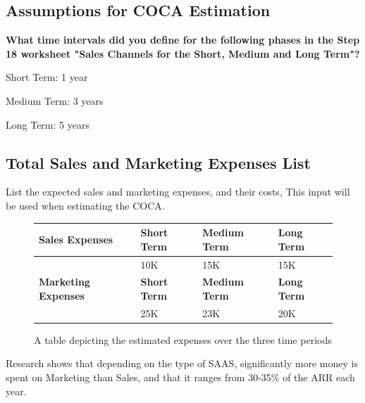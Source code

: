 \documentclass{article}
\begin{document}
        \subsection{Assumptions for COCA Estimation}
        
            \textbf{What time intervals did you define for the following phases in the Step 18 worksheet "Sales Channels for the Short, Medium and Long Term"?}

            Short Term: 1 year
            
            Medium Term: 3 years
            
            Long Term: 5 years

        \subsection{Total Sales and Marketing Expenses List}

            List the expected sales and marketing expenses, and their costs, This input will be used when estimating the COCA.

            \begin{figure} [h!]
                \begin{center}
                    \begin{tabular}{| p{2.75cm} | p{3.5cm} | p{3.5cm} | p{3.5cm} |}
                        \hline
                        \textbf{Sales Expenses} & \textbf{Short Term} & \textbf{Medium Term} & \textbf{Long Term}
                        \\ \hline
                        & 10K & 15K & 15K
                        \\ \hline
                        \raggedright \textbf{Marketing Expenses} &
                            \raggedright \textbf{Short Term} & 
                            \raggedright\textbf{Medium Term} & \textbf{Long Term}
                        \\ \hline
                        & 25K & 23K & 20K
                        \\ \hline
                    \end{tabular}
                    \caption{A table depicting the estimated expenses over the three time periods}
                \end{center}
            \end{figure}
            Research shows that depending on the type of SAAS, significantly more money is spent on Marketing than Sales, and that it ranges from 30-35\% of the ARR each year.
\end{document}
